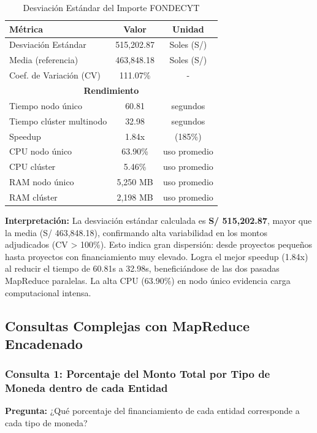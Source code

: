 \documentclass[12pt,a4paper]{article}
\begin{document}
\begin{table}[H]
\centering
\begin{tabular}{lcc}
\toprule
\textbf{Métrica} & \textbf{Valor} & \textbf{Unidad} \\
\midrule
Desviación Estándar & 515,202.87 & Soles (S/) \\
Media (referencia) & 463,848.18 & Soles (S/) \\
Coef. de Variación (CV) & 111.07\% & - \\
\midrule
\multicolumn{3}{c}{\textbf{Rendimiento}} \\
\midrule
Tiempo nodo único & 60.81 & segundos \\
Tiempo clúster multinodo & 32.98 & segundos \\
Speedup & 1.84x & (185\%) \\
\midrule
CPU nodo único & 63.90\% & uso promedio \\
CPU clúster & 5.46\% & uso promedio \\
RAM nodo único & 5,250 MB & uso promedio \\
RAM clúster & 2,198 MB & uso promedio \\
\bottomrule
\end{tabular}
\caption{Desviación Estándar del Importe FONDECYT}
\label{tab:desviacion}
\end{table}

\textbf{Interpretación:} La desviación estándar calculada es \textbf{S/ 515,202.87}, mayor que la media (S/ 463,848.18), confirmando alta variabilidad en los montos adjudicados (CV > 100\%). Esto indica gran dispersión: desde proyectos pequeños hasta proyectos con financiamiento muy elevado. Logra el mejor speedup (1.84x) al reducir el tiempo de 60.81s a 32.98s, beneficiándose de las dos pasadas MapReduce paralelas. La alta CPU (63.90\%) en nodo único evidencia carga computacional intensa.

\subsection{Consultas Complejas con MapReduce Encadenado}

\subsubsection{Consulta 1: Porcentaje del Monto Total por Tipo de Moneda dentro de cada Entidad}

\textbf{Pregunta:} ¿Qué porcentaje del financiamiento de cada entidad corresponde a cada tipo de moneda?
\end{document}
